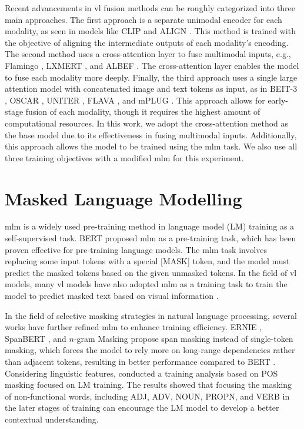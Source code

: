 Recent advancements in \acrshort{vl} fusion methods can be roughly categorized into three main approaches.  
The first approach is a separate unimodal encoder for each modality, as seen in models like CLIP \cite{clip} and ALIGN \cite{align}.  
This method is trained with the objective of aligning the intermediate outputs of each modality's encoding.  
The second method uses a cross-attention layer to fuse multimodal inputs, e.g., Flamingo \cite{flamingo}, LXMERT \cite{lxmert}, and ALBEF \cite{albef}.  
The cross-attention layer enables the model to fuse each modality more deeply.  
Finally, the third approach uses a single large attention model with concatenated image and text tokens as input, as in BEIT-3 \cite{beit-3}, OSCAR \cite{oscar}, UNITER \cite{uniter}, FLAVA \cite{flava}, and mPLUG \cite{mplug}.  
This approach allows for early-stage fusion of each modality, though it requires the highest amount of computational resources.  
In this work, we adopt the cross-attention method as the base model due to its effectiveness in fusing multimodal inputs.  
Additionally, this approach allows the model to be trained using the \acrshort{mlm} task.  
We also use all three training objectives with a modified \acrshort{mlm} for this experiment.  

\section{Masked Language Modelling}
\acrshort{mlm} is a widely used pre-training method in language model (LM) training \cite{bert, albert, dictbert, opt, realm} as a self-supervised task.  
BERT \cite{bert} proposed \acrshort{mlm} as a pre-training task, which has been proven effective for pre-training language models.  
The \acrshort{mlm} task involves replacing some input tokens with a special [MASK] token, and the model must predict the masked tokens based on the given unmasked tokens.  
In the field of \acrshort{vl} models, many \acrshort{vl} models have also adopted \acrshort{mlm} as a training task to train the model to predict masked text based on visual information \cite{albef, mplug, uniter, beit-3}.  

In the field of selective masking strategies in natural language processing, several works have further refined \acrshort{mlm} to enhance training efficiency.  
ERNIE \cite{ERNIE}, SpanBERT \cite{spanBERT}, and \(n\)-gram Masking \cite{n-gram-masking} propose span masking instead of single-token masking, which forces the model to rely more on long-range dependencies rather than adjacent tokens, resulting in better performance compared to BERT \cite{bert}.  
Considering linguistic features,  conducted a training analysis based on POS masking focused on LM training.  
The results showed that focusing the masking of non-functional words, including ADJ, ADV, NOUN, PROPN, and VERB in the later stages of training can encourage the LM model to develop a better contextual understanding.  


